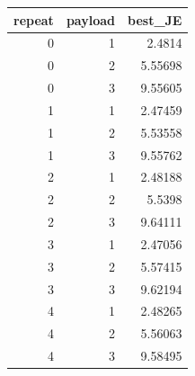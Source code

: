 \begin{tabular}{rrr}
\toprule
repeat & payload & best\_JE \\
\midrule
0 & 1 & 2.4814 \\
0 & 2 & 5.55698 \\
0 & 3 & 9.55605 \\
1 & 1 & 2.47459 \\
1 & 2 & 5.53558 \\
1 & 3 & 9.55762 \\
2 & 1 & 2.48188 \\
2 & 2 & 5.5398 \\
2 & 3 & 9.64111 \\
3 & 1 & 2.47056 \\
3 & 2 & 5.57415 \\
3 & 3 & 9.62194 \\
4 & 1 & 2.48265 \\
4 & 2 & 5.56063 \\
4 & 3 & 9.58495 \\
\bottomrule
\end{tabular}
